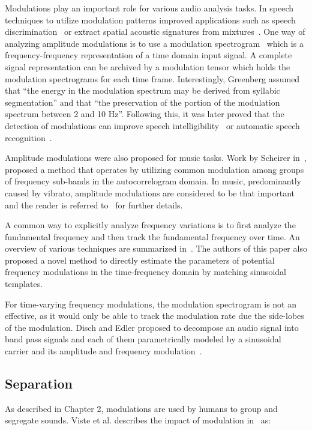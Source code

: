 Modulations play an important role for various audio analysis tasks.
In speech techniques to utilize modulation patterns improved applications such as speech discrimination~\cite{mesgarani04} or extract spatial acoustic signatures from mixtures~\cite{sukittanon06}.
One way of analyzing amplitude modulations is to use a modulation spectrogram~\cite{greenberg97} which is a frequency-frequency representation of a time domain input signal.
A complete signal representation can be archived by a modulation tensor which holds the modulation spectrograms for each time frame.
Interestingly, Greenberg assumed that ``the energy in the modulation spectrum may be derived from syllabic segmentation'' and that ``the preservation of the portion of the modulation spectrum between 2 and 10 Hz''.
Following this, it was later proved that the detection of modulations can improve speech intelligibility~\cite{elhilali03} or automatic speech recognition~\cite{kingsbury98}.
\par
Amplitude modulations were also proposed for music tasks. 
Work by Scheirer in~\cite{scheirer99}, proposed a method that operates by utilizing common modulation among groups of frequency sub-bands in the autocorrelogram domain.
In music, predominantly caused by vibrato, amplitude modulations are considered to be that important and the reader is referred to~\cite{muller11} for further details.
\par
A common way to explicitly analyze frequency variations is to first analyze the fundamental frequency and then track the fundamental frequency over time. 
An overview of various techniques are summarized in~\cite{driedger16}.
The authors of this paper also proposed a novel method to directly estimate the parameters of potential frequency modulations in the time-frequency domain by matching sinusoidal templates.
\par
For time-varying frequency modulations, the modulation spectrogram is not an effective, as it would only be able to track the modulation rate due the side-lobes of the modulation.
Disch and Edler proposed to decompose an audio signal into band pass signals and each of them parametrically modeled by a sinusoidal carrier and its amplitude and frequency modulation~\cite{disch09}.

\subsection{Separation}

As described in Chapter 2, modulations are used by humans to group and segregate sounds. Viste et al. describes the impact of modulation in~\cite{viste03} as:

